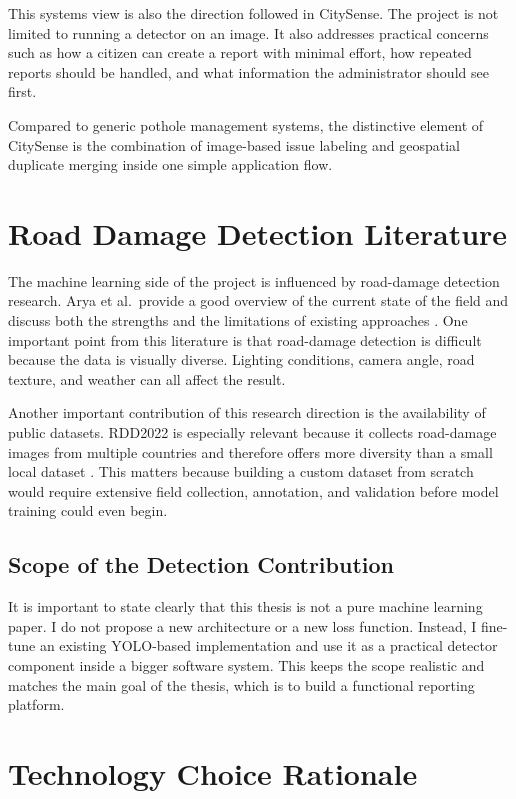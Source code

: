 This systems view is also the direction followed in CitySense. The project is not limited to running a detector on an image. It also addresses practical concerns such as how a citizen can create a report with minimal effort, how repeated reports should be handled, and what information the administrator should see first.

Compared to generic pothole management systems, the distinctive element of CitySense is the combination of image-based issue labeling and geospatial duplicate merging inside one simple application flow.

\section{Road Damage Detection Literature}

The machine learning side of the project is influenced by road-damage detection research. Arya et al.\ provide a good overview of the current state of the field and discuss both the strengths and the limitations of existing approaches \cite{arya2022rdd2022}. One important point from this literature is that road-damage detection is difficult because the data is visually diverse. Lighting conditions, camera angle, road texture, and weather can all affect the result.

Another important contribution of this research direction is the availability of public datasets. RDD2022 is especially relevant because it collects road-damage images from multiple countries and therefore offers more diversity than a small local dataset \cite{arya2022rdd2022}. This matters because building a custom dataset from scratch would require extensive field collection, annotation, and validation before model training could even begin.

\subsection{Scope of the Detection Contribution}

It is important to state clearly that this thesis is not a pure machine learning paper. I do not propose a new architecture or a new loss function. Instead, I fine-tune an existing YOLO-based implementation and use it as a practical detector component inside a bigger software system. This keeps the scope realistic and matches the main goal of the thesis, which is to build a functional reporting platform.

\section{Technology Choice Rationale}

